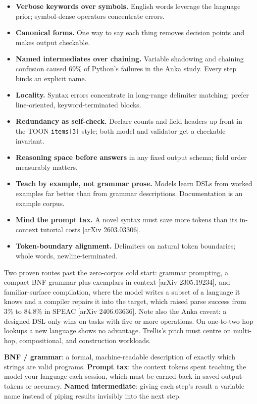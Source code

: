 \documentclass[11pt]{article}
\begin{document}
\begin{itemize}[leftmargin=1.4em,itemsep=2pt]
  \item \textbf{Verbose keywords over symbols.} English words leverage the language prior; symbol-dense operators concentrate errors.
  \item \textbf{Canonical forms.} One way to say each thing removes decision points and makes output checkable.
  \item \textbf{Named intermediates over chaining.} Variable shadowing and chaining confusion caused 69\% of Python's failures in the Anka study. Every step binds an explicit name.
  \item \textbf{Locality.} Syntax errors concentrate in long-range delimiter matching; prefer line-oriented, keyword-terminated blocks.
  \item \textbf{Redundancy as self-check.} Declare counts and field headers up front in the TOON \texttt{items[3]} style; both model and validator get a checkable invariant.
  \item \textbf{Reasoning space before answers} in any fixed output schema; field order measurably matters.
  \item \textbf{Teach by example, not grammar prose.} Models learn DSLs from worked examples far better than from grammar descriptions. Documentation is an example corpus.
  \item \textbf{Mind the prompt tax.} A novel syntax must save more tokens than its in-context tutorial costs [arXiv 2603.03306].
  \item \textbf{Token-boundary alignment.} Delimiters on natural token boundaries; whole words, newline-terminated.
\end{itemize}

Two proven routes past the zero-corpus cold start: grammar prompting, a compact BNF grammar plus exemplars in context [arXiv 2305.19234], and familiar-surface compilation, where the model writes a subset of a language it knows and a compiler repairs it into the target, which raised parse success from 3\% to 84.8\% in SPEAC [arXiv 2406.03636]. Note also the Anka caveat: a designed DSL only wins on tasks with five or more operations. On one-to-two hop lookups a new language shows no advantage. Trellis's pitch must centre on multi-hop, compositional, and construction workloads.

\begin{glossbox}
\textbf{BNF / grammar}: a formal, machine-readable description of exactly which strings are valid programs. \textbf{Prompt tax}: the context tokens spent teaching the model your language each session, which must be earned back in saved output tokens or accuracy. \textbf{Named intermediate}: giving each step's result a variable name instead of piping results invisibly into the next step.
\end{glossbox}
\end{document}

